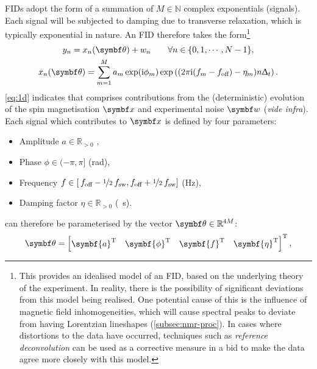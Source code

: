 \acp{FID} adopt the form of a summation of $M \in \mathbb{N}$ complex
exponentials (signals). Each signal will be subjected to damping due to
transverse relaxation, which is typically exponential in nature. An \ac{FID}
therefore takes the form\footnote{
    This provides an idealised model of an \ac{FID}, based on the
    underlying theory of the experiment. In reality, there is the possibility
    of significant deviations from this model being realised. One potential
    cause of this is the influence of magnetic field inhomogeneities, which
    will cause spectral peaks to deviate from having Lorentzian lineshapes
    (\cref{subsec:nmr-proc}). In cases where distortions to the data have
    occurred, techniques such as \emph{reference deconvolution}\cite{Morris1997}
    can be used as a corrective measure in a bid to make the data agree more
    closely with this model.
}
\begin{subequations}
    \begin{gather}
        y_n = x_n(\bth) + w_n \quad
            \quad \forall n \in \lbrace 0, 1, \cdots, N - 1 \rbrace,
            \label{eq:y=x+w} \\
        x_n(\bth) =
        \sumM \amexpphim \exp\left(
            (2 \pi \iu (f_m - \foff)- \eta_m ) n \Dt
        \right).
        \label{eq:x}
    \end{gather}
    \label{eq:1d}%
\end{subequations}%
\cref{eq:1d} indicates that  comprises contributions from the
(deterministic) evolution of the spin magnetisation $\bx$ and experimental
noise $\bw$ (\emph{vide infra}). Each signal which contributes to $\bx$ is
defined by four parameters:
\begin{itemize}
    \item Amplitude $a \in \mathbb{R}_{>0}$ ,
    \label{pg:param-constraints}
    \item Phase $\phi \in (-\pi, \pi]$ (\unit{\radian}),
    \item Frequency $f \in \left[\hspace*{2pt}f_{\text{off}} - \nicefrac{1}{2} \hspace*{2pt}
        f_{\mathrm{sw}}, f_{\text{off}} + \nicefrac{1}{2} \hspace*{2pt}f_{\mathrm{sw}} \right]$ (\unit{\hertz}),
    \item Damping factor $\eta \in \mathbb{R}_{>0}$ (\unit{\per\second}).
\end{itemize}%
 can therefore be parameterised by the vector $\bth \in
\mathbb{R}^{4M}$:
\begin{equation}
    \bth =
    \begin{bmatrix}
        \symbf{a}\T & \symbf{\phi}\T & \symbf{f}\T & \symbf{\eta}\T
    \end{bmatrix}\T,
\end{equation}
